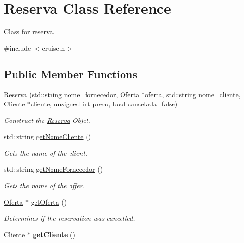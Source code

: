 \hypertarget{classReserva}{}\section{Reserva Class Reference}
\label{classReserva}


Class for reserva.  




{\ttfamily \#include $<$cruise.\+h$>$}

\subsection*{Public Member Functions}
\begin{DoxyCompactItemize}
\item 
\hyperlink{classReserva_a96145a1381e9a9e5bb2091bb17e1d496}{Reserva} (std\+::string nome\+\_\+fornecedor, \hyperlink{classOferta}{Oferta} $\ast$oferta, std\+::string nome\+\_\+cliente, \hyperlink{classCliente}{Cliente} $\ast$cliente, unsigned int preco, bool cancelada=false)
\begin{DoxyCompactList}\small\item\em Construct the \hyperlink{classReserva}{Reserva} Objet. \end{DoxyCompactList}\item 
std\+::string \hyperlink{classReserva_a87b0465c8e9d2291d5dddd48fce24c38}{get\+Nome\+Cliente} ()
\begin{DoxyCompactList}\small\item\em Gets the name of the client. \end{DoxyCompactList}\item 
std\+::string \hyperlink{classReserva_ad54ef5f67fa096e711d2ab526db30bf3}{get\+Nome\+Fornecedor} ()
\begin{DoxyCompactList}\small\item\em Gets the name of the offer. \end{DoxyCompactList}\item 
\hyperlink{classOferta}{Oferta} $\ast$ \hyperlink{classReserva_ac7fb69d14f442f58961bd337267bd92d}{get\+Oferta} ()
\begin{DoxyCompactList}\small\item\em Determines if the reservation was cancelled. \end{DoxyCompactList}\item 
\mbox{\label{classReserva_a3b8ef1c42c35aabcc2bdde4767b4bace}} 
\hyperlink{classCliente}{Cliente} $\ast$ {\bfseries get\+Cliente} ()

\end{DoxyCompactItemize}
